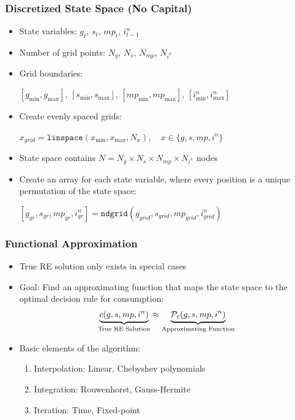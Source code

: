 \documentclass[11pt]{beamer}
\begin{document}
\begin{frame}\frametitle{Discretized State Space (No Capital)}

\begin{itemize}\setlength{\itemsep}{10pt}
  \item <1-|handout:1>State variables: $g_t$, $s_t$, $mp_t$, $i^n_{t-1}$
  \item <2-|handout:1>Number of grid points: $N_g$, $N_{s}$, $N_{mp}$, $N_{i^n}$
  \item <3-|handout:1>Grid boundaries: 
\begin{center}
$[g_{\min},g_{\max}]$, $[s_{\min},s_{\max}]$, $[mp_{\min},mp_{\max}]$, $[i^n_{\min},i^n_{\max}]$
\end{center}
  \item <4-|handout:1>Create evenly spaced grids:
  \begin{center}
    $x_{grid} = \texttt{linspace}(x_{\min},x_{\max},N_x), \quad x\in\{g,s,mp,i^n\}$
  \end{center}
  \item <5-|handout:1>State space contains $N=N_g\times N_s\times N_{mp}\times N_{i^n}$ nodes
  \item <6-|handout:1>Create an array for each state variable, where every position is a unique permutation of the state space:
  \begin{center}
    $[g_{gr},s_{gr},mp_{gr},i^n_{gr}] = \texttt{ndgrid}(g_{grid},s_{grid},mp_{grid},i^n_{grid})$
  \end{center}
\end{itemize}

\end{frame}

\begin{frame}\frametitle{Functional Approximation}

\begin{itemize}\setlength{\itemsep}{12pt}
  \item <1-|handout:1>True RE solution only exists in special cases %
  \item <2-|handout:1>Goal: Find an approximating function that maps the state space to the optimal decision rule for consumption:
  \begin{gather*}
    \underbrace{c(g,s,mp,i^n)}_{\textrm{True RE Solution}} \approx \underbrace{{\cal{P}}_c(g,s,mp,i^n)}_{\textrm{Approximating Function}}
  \end{gather*}
  \item <3-|handout:1>Basic elements of the algorithm:
  \begin{enumerate}\setlength{\itemsep}{6pt}
    \item Interpolation: Linear, Chebyshev polynomials %
    \item Integration: Rouwenhorst, Gauss-Hermite %
    \item Iteration: Time, Fixed-point 
  \end{enumerate}
\end{itemize}

\end{frame}
\end{document}
